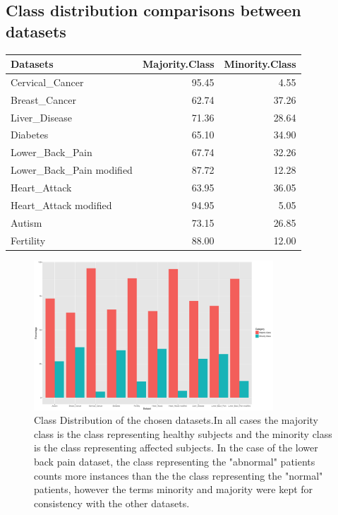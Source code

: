 \subsection{Class distribution comparisons between datasets}


\begin{table}[H]
\centering
\begin{tabular}{lrr}
  \hline
Datasets & Majority.Class & Minority.Class \\ 
  \hline
Cervical\_Cancer & 95.45 & 4.55 \\ 
  Breast\_Cancer & 62.74 & 37.26 \\ 
  Liver\_Disease & 71.36 & 28.64 \\ 
  Diabetes & 65.10 & 34.90 \\ 
  Lower\_Back\_Pain & 67.74 & 32.26 \\ 
  Lower\_Back\_Pain modified & 87.72 & 12.28 \\ 
  Heart\_Attack & 63.95 & 36.05 \\ 
  Heart\_Attack modified & 94.95 & 5.05 \\ 
  Autism & 73.15 & 26.85 \\ 
  Fertility & 88.00 & 12.00 \\ 
   \hline
\end{tabular}
\end{table}

\begin{figure}[H]
    \centering
    \includegraphics[width=0.8\textwidth]{ThesisTemplate/usingLatex/chapter4Images/figure4_1b.png}
    \caption{Class Distribution of the chosen datasets.\newline In all cases the majority class is the class representing healthy subjects and the minority class is the class representing affected subjects. In the case of the lower back pain dataset, the class representing the "abnormal" patients counts more instances than the the class representing the "normal" patients, however the terms minority and majority were kept for consistency with the other datasets.}
    \label{fig:my_label}
\end{figure}
